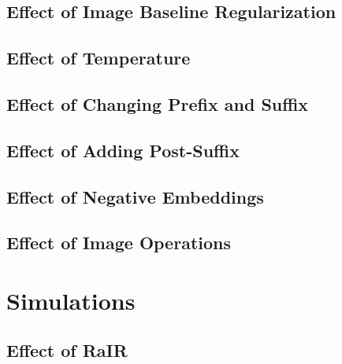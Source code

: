 \subsection{Effect of Image Baseline Regularization}
\label{sec:reg-beta}


\subsection{Effect of Temperature}
\label{sec:reg-temperature}


\subsection{Effect of Changing Prefix and Suffix}
\label{sec:prefix-suffix}


\subsection{Effect of Adding Post-Suffix}
\label{sec:post-suffix}

\subsection{Effect of Negative Embeddings}
\label{sec:negative-embeddings}


\subsection{Effect of Image Operations}
\label{sec:image-operations}



\section{Simulations}
\label{sec:simulations}


\subsection{Effect of RaIR}
\label{sec:effect-rair}
